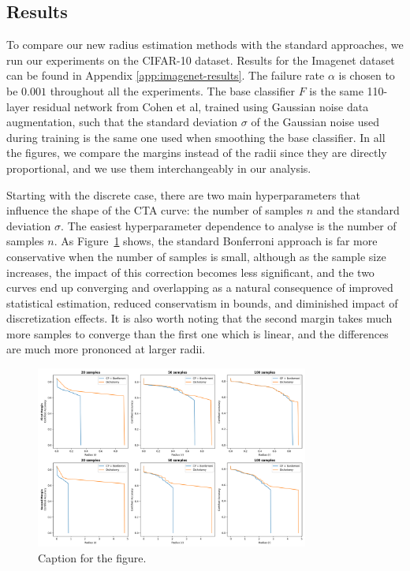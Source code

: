 \subsection{Results}\label{subsec:results}

To compare our new radius estimation methods with the standard approaches, we run our experiments on the CIFAR-10 dataset.
Results for the Imagenet dataset can be found in Appendix \ref{app:imagenet-results}.
The failure rate $\alpha$ is chosen to be $0.001$ throughout all the experiments.
The base classifier $F$ is the same 110-layer residual network from Cohen et al, trained using Gaussian noise data augmentation, such that the standard deviation $\sigma$ of the Gaussian noise used during training is the same one used when smoothing the base classifier.
In all the figures, we compare the margins instead of the radii since they are directly proportional, and we use them interchangeably in our analysis.

Starting with the discrete case, there are two main hyperparameters that influence the shape of the CTA curve: the number of samples $n$ and the standard deviation $\sigma$.
The easiest hyperparameter dependence to analyse is the number of samples $n$.
As Figure~\ref{fig:discrete_num} shows, the standard Bonferroni approach is far more conservative when the number of samples is small, although as the sample size increases, the impact of this correction becomes less significant, and the two curves end up converging and overlapping as a natural consequence of improved statistical estimation, reduced conservatism in bounds, and diminished impact of discretization effects.
It is also worth noting that the second margin takes much more samples to converge than the first one which is linear, and the differences are much more prononced at larger radii.

\begin{figure}[htbp]
    \centering
    \includegraphics[width=0.8\textwidth]{images/discrete_num}
    \caption{Caption for the figure.}
    \label{fig:discrete_num}
\end{figure}

